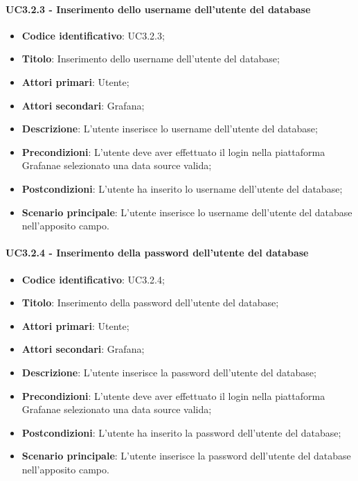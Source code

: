         \paragraph{UC3.2.3 - Inserimento dello username dell'utente del database}
            \begin{itemize}
                \item \textbf{Codice identificativo}: UC3.2.3;
                \item \textbf{Titolo}: Inserimento dello username dell'utente del database;
                \item \textbf{Attori primari}: Utente;
                \item \textbf{Attori secondari}: Grafana\glo;
                \item \textbf{Descrizione}: L'utente inserisce lo username dell'utente del database;
                \item \textbf{Precondizioni}: L'utente deve aver effettuato il login nella piattaforma Grafana\glosp e selezionato una data source valida;
                \item \textbf{Postcondizioni}: L'utente ha inserito lo username dell'utente del database;
                \item \textbf{Scenario principale}: L'utente inserisce lo username dell'utente del database nell'apposito campo.
            \end{itemize}
        \paragraph{UC3.2.4 - Inserimento della password dell'utente del database}
            \begin{itemize}
                \item \textbf{Codice identificativo}: UC3.2.4;
                \item \textbf{Titolo}: Inserimento della password dell'utente del database;
                \item \textbf{Attori primari}: Utente;
                \item \textbf{Attori secondari}: Grafana\glo;
                \item \textbf{Descrizione}: L'utente inserisce la password dell'utente del database;
                \item \textbf{Precondizioni}: L'utente deve aver effettuato il login nella piattaforma Grafana\glosp e selezionato una data source valida;
                \item \textbf{Postcondizioni}: L'utente ha inserito la password dell'utente del database;
                \item \textbf{Scenario principale}: L'utente inserisce la password dell'utente del database nell'apposito campo.
            \end{itemize}
